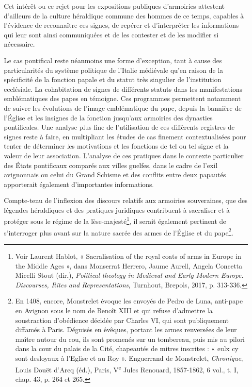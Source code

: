 \documentclass[12pt,twoside,openany]{book}
\begin{document}
Cet intérêt ou ce rejet pour les expositions publiques d’armoiries attestent d’ailleurs de la culture héraldique commune des hommes de ce temps, capables à l’évidence de reconnaître ces signes, de repérer et d’interpréter les informations qui leur sont ainsi communiquées et de les contester et de les modifier si nécessaire.

Le cas pontifical reste néanmoins une forme d’exception, tant à cause des particularités du système politique de l’Italie médiévale qu’en raison de la spécificité de la fonction papale et du statut très singulier de l’institution ecclésiale. La cohabitation de signes de différents statuts dans les manifestations emblématiques des papes en témoigne. Ces programmes permettent notamment de suivre les évolutions de l’image emblématique du pape, depuis la bannière de l’Église et les insignes de la fonction jusqu’aux armoiries des dynasties pontificales. Une analyse plus fine de l’utilisation de ces différents registres de signes reste à faire, en multipliant les études de cas finement contextualisées pour tenter de déterminer les motivations et les fonctions de tel ou tel signe et la valeur de leur association. L’analyse de ces pratiques dans le contexte particulier des États pontificaux comparés aux villes guelfes, dans le cadre de l’exil avignonnais ou celui du Grand Schisme et des conflits entre deux papautés apporterait également d’importantes informations.

Compte-tenu de l’inflexion des discours relatifs aux armoiries souveraines, que des légendes héraldiques et des pratiques juridiques contribuent à sacraliser et à protéger sous le régime de la lèse-majesté\footnote{Voir Laurent Hablot, « Sacralisation of the royal coats of arms in Europe in the Middle Ages », dans Monserrat Herrero, Jaume Aurell, Angela Concetta Micelli Stout (dir.), \textit{Political theology in Medieval and Early Modern Europe. Discourses, Rites and Representations}, Turnhout, Brepols, 2017, p. 313-336.}, il serait également pertinent de s’interroger plus avant sur la nature sacrée des armes de l’Église et du pape\footnote{En 1408, encore, Monstrelet évoque les envoyés de Pedro de Luna, anti-pape en Avignon sous le nom de Benoît XIII et qui refuse d’admettre la soustraction d’obédience décidée par Charles VI, qui sont publiquement diffamés à Paris. Déguisés en évêques, portant les armes renversées de leur maître autour du cou, ils sont promenés sur un tombereau, puis mis au pilori dans la cour du palais de la Cité, chapeautés de mitres inscrites : « eulx cy sont desloyaux à l’Eglise et au Roy ». Enguerrand de Monstrelet, \textit{Chronique}, Louis Douët d’Arcq (éd.), Paris, V\textsuperscript{e} Jules Renouard, 1857-1862, 6 vol., t. I, chap. 43, p. 264 et 265.}.
\end{document}
